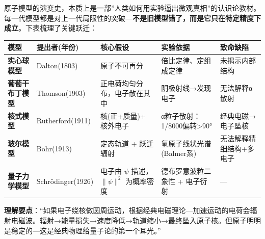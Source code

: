 原子模型的演变史，本质上是一部''人类如何用实验逼出微观真相''的认识论教材。每一代模型都是对上一代局限性的突破---\textbf{不是旧模型错了，而是它只在特定精度下成立}。下表梳理了关键跃迁：

{\def\LTcaptype{none} %
\begin{longtable}[]{@{}
  >{\raggedright\arraybackslash}p{}
  >{\raggedright\arraybackslash}p{}
  >{\raggedright\arraybackslash}p{}
  >{\raggedright\arraybackslash}p{}
  >{\raggedright\arraybackslash}p{}@{}}
\toprule\noalign{}
\begin{minipage}[b]{\linewidth}\raggedright
模型
\end{minipage} & \begin{minipage}[b]{\linewidth}\raggedright
提出者(年份)
\end{minipage} & \begin{minipage}[b]{\linewidth}\raggedright
核心假设
\end{minipage} & \begin{minipage}[b]{\linewidth}\raggedright
实验依据
\end{minipage} & \begin{minipage}[b]{\linewidth}\raggedright
致命缺陷
\end{minipage} \\
\midrule\noalign{}
\endhead
\bottomrule\noalign{}
\endlastfoot
\textbf{实心球模型} & Dalton(1803) & 原子不可再分 & 倍比定律、定组成定律 & 未揭示内部结构 \\
\textbf{葡萄干布丁模型} & Thomson(1903) & 正电荷均匀分布，电子散在其中 & 阴极射线→发现电子 & 无法解释α散射 \\
\textbf{核式模型} & Rutherford(1911) & 核(正+质量)+ 核外电子 & α粒子散射：1/8000偏转\textgreater90° & 经典电磁→电子坠核 \\
\textbf{玻尔模型} & Bohr(1913) & 定态轨道 + 跃迁辐射 & 氢原子线状光谱(Balmer系) & 无法解释精细结构+多电子 \\
\textbf{量子力学模型} & Schrödinger(1926) & 电子由 \(\psi\) 描述，\(\|\psi\|^2\) 为概率密度 & 德布罗意波粒二象性 + 电子衍射 & --- \\
\end{longtable}
}

\textbf{理解要点}：``如果电子绕核做圆周运动，根据经典电磁理论---加速运动的电荷会辐射电磁波。辐射→能量损失→速度降低→轨道缩小→最终坠入原子核。但原子明明是稳定的---这是经典物理给量子论的第一个耳光。''

